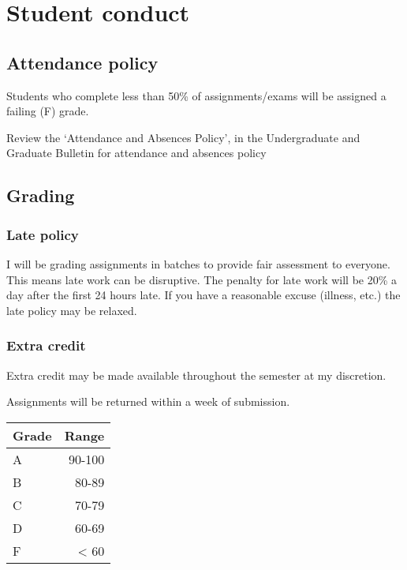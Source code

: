 \documentclass[11pt,]{article}
\begin{document}
\newpage

\hypertarget{student-conduct}{%
\section{Student conduct}\label{student-conduct}}

\hypertarget{attendance-policy}{%
\subsection{Attendance policy}\label{attendance-policy}}

Students who complete less than 50\% of assignments/exams will be
assigned a failing (F) grade.

Review the `Attendance and Absences Policy', in the Undergraduate and
Graduate Bulletin for attendance and absences policy

\hypertarget{grading}{%
\subsection{Grading}\label{grading}}

\hypertarget{late-policy}{%
\subsubsection{Late policy}\label{late-policy}}

I will be grading assignments in batches to provide fair assessment to
everyone. This means late work can be disruptive. The penalty for late
work will be 20\% a day after the first 24 hours late. If you have a
reasonable excuse (illness, etc.) the late policy may be relaxed.

\hypertarget{extra-credit}{%
\subsubsection{Extra credit}\label{extra-credit}}

Extra credit may be made available throughout the semester at my
discretion.

Assignments will be returned within a week of submission.

\begin{longtable}[]{@{}lr@{}}
\toprule()
Grade & Range \\
\midrule()
\endhead
A & 90-100 \\
B & 80-89 \\
C & 70-79 \\
D & 60-69 \\
F & \textless{} 60 \\
\bottomrule()
\end{longtable}
\end{document}
